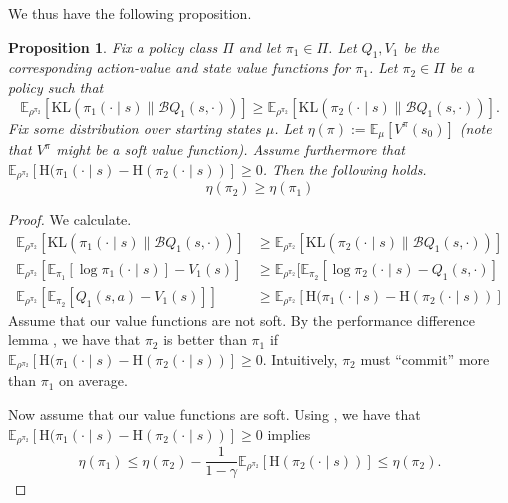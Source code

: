\documentclass{article}
\newcommand{\Ex}{\mathbb{E}}
\newcommand{\KL}{\mathrm{KL}}
\newcommand{\boltzmannQ}{\mathcal{B}Q}
\newcommand{\entropy}{\mathrm{H}}
\newtheorem{proposition}{Proposition}
\begin{document}
We thus have the following proposition. 
\begin{proposition}\label{prop:avg-reverse-kl}
Fix a policy class $\Pi$ and let $\pi_1 \in \Pi$. Let $Q_1, V_1$ be the corresponding action-value and state value functions for $\pi_1$. Let $\pi_2 \in \Pi$ be a policy such that
\begin{equation}
    \Ex_{\rho^{\pi_2}}[\KL(\pi_1(\cdot \mid s) \parallel \boltzmannQ_1(s, \cdot))] \geq \Ex_{\rho^{\pi_2}}[\KL(\pi_2(\cdot \mid s) \parallel \boltzmannQ_1(s, \cdot))].
\end{equation}
Fix some distribution over starting states $\mu$. Let $\eta(\pi) := \Ex_\mu[V^\pi(s_0)]$ (note that $V^\pi$ might be a soft value function). Assume furthermore that $\Ex_{\rho^{\pi_2}}[\entropy(\pi_1(\cdot \mid s) - \entropy(\pi_2(\cdot \mid s))] \geq 0$. Then the following holds. 
\begin{equation}
    \eta(\pi_2) \geq \eta(\pi_1)
\end{equation}
\end{proposition}
\begin{proof}
We calculate. 
\begin{align*}
    \Ex_{\rho^{\pi_2}}[\KL(\pi_1(\cdot \mid s) \parallel \boltzmannQ_1(s, \cdot))] &\geq \Ex_{\rho^{\pi_2}}[\KL(\pi_2(\cdot \mid s) \parallel \boltzmannQ_1(s, \cdot))]\\
    \Ex_{\rho^{\pi_2}}[\Ex_{\pi_1}[\log \pi_1(\cdot \mid s)] - V_1(s)] &\geq \Ex_{\rho^{\pi_2}}[\Ex_{\pi_2}[\log \pi_2(\cdot \mid s) - Q_1(s, \cdot)]\\
    \Ex_{\rho^{\pi_2}}[\Ex_{\pi_2}[Q_1(s, a) - V_1(s)]] &\geq \Ex_{\rho^{\pi_2}}[\entropy(\pi_1(\cdot \mid s) - \entropy(\pi_2(\cdot \mid s))]
\end{align*}
Assume that our value functions are not soft. By the performance difference lemma \citep{kakade2002approximately,schulman2015trust}, we have that $\pi_2$ is better than $\pi_1$ if $\Ex_{\rho^{\pi_2}}[\entropy(\pi_1(\cdot \mid s) - \entropy(\pi_2(\cdot \mid s))] \geq 0$. Intuitively, $\pi_2$ must ``commit'' more than $\pi_1$ on average. 

Now assume that our value functions are soft. Using , we have that $\Ex_{\rho^{\pi_2}}[\entropy(\pi_1(\cdot \mid s) - \entropy(\pi_2(\cdot \mid s))] \geq 0$ implies
\begin{equation}
    \eta(\pi_1) \leq \eta(\pi_2) - \frac{1}{1- \gamma} \Ex_{\rho^{\pi_2}}[\entropy(\pi_2(\cdot \mid s))] \leq \eta(\pi_2).
\end{equation}

\end{proof}
\end{document}
